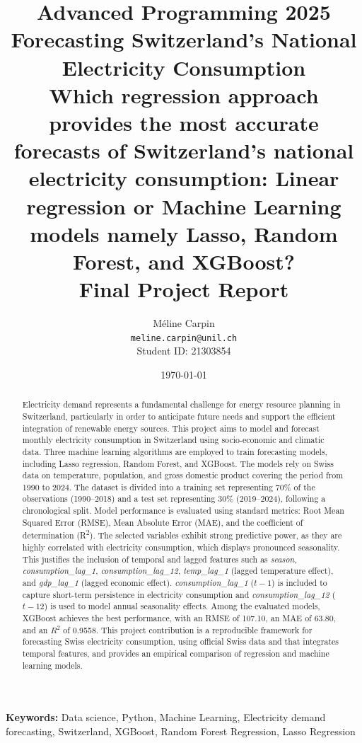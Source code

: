 \documentclass[11pt,a4paper]{article}
\title{%
    \Large \textbf{Advanced Programming 2025} \\
    \vspace{0.5cm}
     \LARGE \textbf{Forecasting Switzerland’s National Electricity Consumption} \\
    \vspace{0.4cm}
    \large \textbf {Which regression approach provides the most accurate forecasts of Switzerland’s national electricity consumption: Linear regression or Machine Learning models namely Lasso, Random Forest, and XGBoost?} \\
    \vspace{0.6cm}
    \large Final Project Report
}
\author{
    Méline Carpin \\
    \texttt{meline.carpin@unil.ch} \\
    Student ID: 21303854
}
\date{\today}
\begin{document}
\maketitle
\thispagestyle{empty}

\begin{abstract}
\noindent
Electricity demand represents a fundamental challenge for energy resource planning in Switzerland, particularly in order to anticipate future needs and support the efficient integration of renewable energy sources. This project aims to model and forecast monthly electricity consumption in Switzerland using socio-economic and climatic data. Three machine learning algorithms are employed to train forecasting models, including Lasso regression, Random Forest, and XGBoost. The models rely on Swiss data on temperature, population, and gross domestic product covering the period from 1990 to 2024. The dataset is divided into a training set representing 70\% of the observations (1990--2018) and a test set representing 30\% (2019--2024), following a chronological split. Model performance is evaluated using standard metrics: Root Mean Squared Error (RMSE), Mean Absolute Error (MAE), and the coefficient of determination (R\textsuperscript{2}). The selected variables exhibit strong predictive power, as they are highly correlated with electricity consumption, which displays pronounced seasonality. This justifies the inclusion of temporal and lagged features such as \textit{season}, \textit{consumption\_lag\_1}, \textit{consumption\_lag\_12}, \textit{temp\_lag\_1} (lagged temperature effect), and \textit{gdp\_lag\_1} (lagged economic effect). \textit{consumption\_lag\_1} ($t-1$) is included to capture short-term persistence in electricity consumption and \textit{consumption\_lag\_12} ($t-12$) is used to model annual seasonality effects. Among the evaluated models, XGBoost achieves the best performance, with an RMSE of 107.10, an MAE of 63.80, and an $R^2$ of 0.9558. This project contribution is a reproducible framework for forecasting Swiss electricity consumption, using official Swiss data and that integrates temporal features, and provides an empirical comparison of regression and machine learning models.

\end{abstract}

\vspace{0.5cm}
\noindent\textbf{Keywords:} Data science, Python, Machine Learning, Electricity demand forecasting, Switzerland, XGBoost, Random Forest Regression, Lasso Regression
\end{document}
